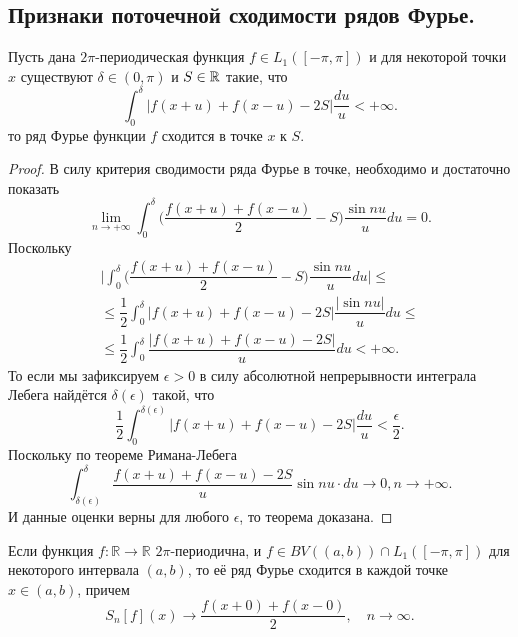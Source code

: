 \subsection{Признаки поточечной сходимости рядов Фурье.}
\begin{theorem}
	Пусть дана $2\pi$-периодическая функция $f \in L_1([-\pi, \pi])$ и для некоторой точки $x$ существуют $\delta \in (0, \pi)$ и $S \in \mathbb{R}$ такие, что \[
																																							\int_0^\delta |f(x + u) + f(x - u) - 2S|\dfrac{du}{u} < +\infty.
	\]
	то ряд Фурье функции $f$ сходится в точке $x$ к $S$.
\end{theorem}
\begin{proof}
	В силу критерия сводимости ряда Фурье в точке, необходимо и достаточно показать \[
																						\lim\limits_{n \rightarrow +\infty} \int_0^\delta \biggr(\dfrac{f(x + u) + f(x - u)}{2} - S\biggr)\dfrac{\sin nu}{u}du = 0.
	\]
	Поскольку \begin{multline*}
				  \biggr|\int_0^\delta \biggr(\dfrac{f(x + u) + f(x - u)}{2} - S\biggr)\dfrac{\sin nu}{u}du\biggr| \leq \\ \leq \dfrac{1}{2}\int_0^\delta |f(x + u) + f(x - u) - 2S|\dfrac{|\sin nu|}{u}du \leq \\ \leq \dfrac{1}{2}\int_0^\delta \dfrac{|f(x + u) + f(x - u) - 2S|}{u}du < +\infty.
	\end{multline*}
	То если мы зафиксируем $\epsilon > 0$ в силу абсолютной непрерывности интеграла Лебега найдётся $\delta(\epsilon)$ такой, что \[
																																	  \dfrac{1}{2}\int_0^{\delta(\epsilon)} |f(x + u) + f(x - u) - 2S|\dfrac{du}{u} < \dfrac{\epsilon}{2}.
	\]
	Поскольку по теореме Римана-Лебега \[
										  \int_{\delta(\epsilon)}^\delta \dfrac{f(x + u) + f(x - u) - 2S}{u}\sin nu\cdot du \rightarrow 0, n \rightarrow +\infty.
	\]
	И данные оценки верны для любого $\epsilon$, то теорема доказана.
\end{proof}

\begin{theorem}
	Если функция $f:\mathbb{R} \to \mathbb{R}$ $2\pi$-периодична, и $f \in BV((a,b)) \cap L_{1}([-\pi,\pi])$ для некоторого интервала $(a,b)$, то её ряд Фурье сходится в каждой точке $x \in (a,b)$, причем
	$$
	S_{n}[f](x) \to \frac{f(x+0)+f(x-0)}{2}, \quad n \to \infty.
	$$
\end{theorem}

